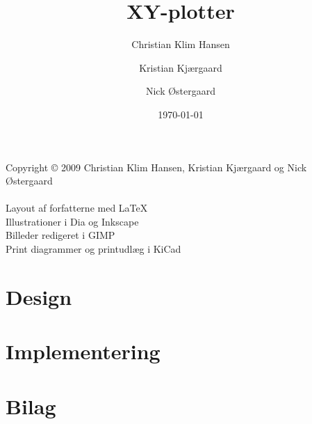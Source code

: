 \documentclass{mypaper}
\title{XY-plotter}
\author{Christian Klim Hansen \and Kristian Kjærgaard \and Nick Østergaard}
\date{\today}
\begin{document}


\setcounter{page}{2}

\strut \vfill { \footnotesize
  \noindent 
  Copyright © 2009 Christian Klim Hansen, Kristian Kjærgaard og Nick Østergaard\\\\
  \noindent
  Layout af forfatterne med \LaTeX\\
  Illustrationer i Dia og Inkscape\\
  Billeder redigeret i GIMP\\
  Print diagrammer og printudlæg i KiCad
}

\thispagestyle{empty}

\clearpage

\frontmatter

\tableofcontents



\mainmatter




\part{Design}
\label{prt:design}





\part{Implementering}
\label{prt:implementering}





\backmatter




\part{Bilag}
\appendix





\nocite{*}


\label{ch:litteratur}

\listoffigures

\listoftables

\listoffixmes
\end{document}
